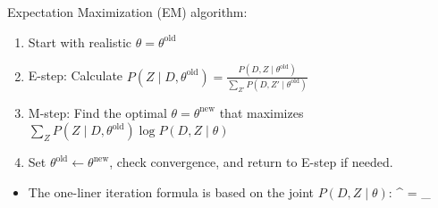 \no Expectation Maximization (EM) algorithm:
\begin{enumerate}
	\item Start with realistic $\theta = \theta^\text{old}$
	\item E-step: Calculate $P(Z\;|\;D,\theta^\text{old}) = \frac{P(D, Z\;|\;\theta^\text{old})}{\sum_{Z'} P(D,Z'\;|\;\theta^\text{old})}$
	\item M-step: Find the optimal $\theta = \theta^\text{new}$ that maximizes $\sum_Z P(Z\;|\;D,\theta^\text{old})\log P(D,Z\;|\;\theta)$
	\item Set $\theta^\text{old} \leftarrow \theta^\text{new}$, check convergence, and return to E-step if needed.
\end{enumerate}

\begin{itemize}
	\item The one-liner iteration formula is based on the joint $P(D,Z\;|\;\theta)$:
	\be
		\theta^ = \amax_\theta{}
	\ee
\end{itemize}


\newpage

